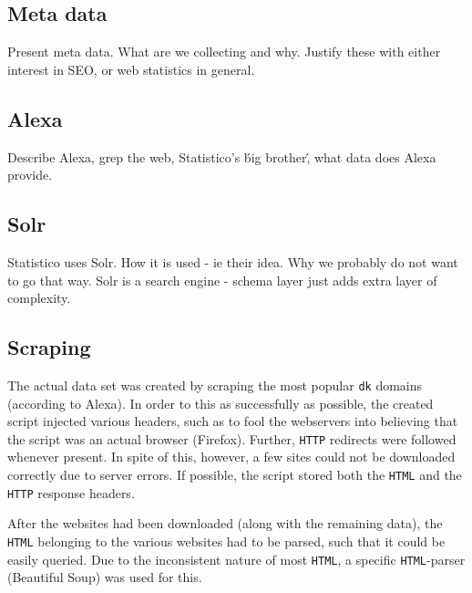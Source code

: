 \subsection{Meta data}
\label{subsec:meta_data}
Present meta data. What are we collecting and why. Justify these with either interest in SEO, or web statistics in general.

\subsection{Alexa}
\label{subsec:alexa}
Describe Alexa, grep the web, Statistico's \'big brother\', what data does Alexa provide.

\subsection{Solr}
\label{subsec:solr}
Statistico uses Solr. How it is used - ie their idea. Why we probably do not want to go that way. Solr is a search engine - schema layer just adds extra layer of complexity.

\subsection{Scraping}
\label{subsec:scraping}


The actual data set was created by scraping the most popular \texttt{dk} domains (according to Alexa). In order to this as successfully as possible, the created script injected various headers, such as to fool the webservers into believing that the script was an actual browser (Firefox). Further, \texttt{HTTP} redirects were followed whenever present. In spite of this, however, a few sites could not be downloaded correctly due to server errors. If possible, the script stored both the \texttt{HTML} and the \texttt{HTTP} response headers.

After the websites had been downloaded (along with the remaining data), the \texttt{HTML} belonging to the various websites had to be parsed, such that it could be easily queried. Due to the inconsistent nature of most \texttt{HTML}, a specific \texttt{HTML}-parser (Beautiful Soup) was used for this.
